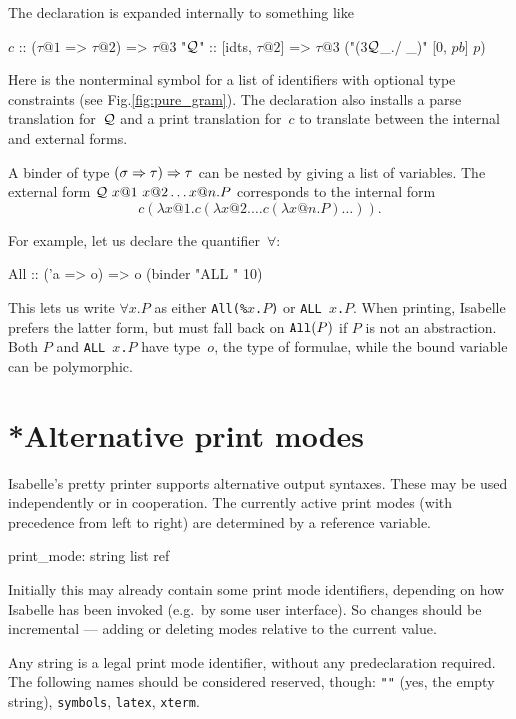 The declaration is expanded internally to something like
\begin{ttbox}
\(c\)\hskip3pt    :: (\(\tau@1\) => \(\tau@2\)) => \(\tau@3\)
"\({\cal Q}\)"  :: [idts, \(\tau@2\)] => \(\tau@3\)   ("(3\({\cal Q}\)_./ _)" [0, \(pb\)] \(p\))
\end{ttbox}
Here  is the nonterminal symbol for a list of identifiers with
optional type constraints (see Fig.\ts\ref{fig:pure_gram}).  The
declaration also installs a parse translation
for~${\cal Q}$ and a print translation for~$c$ to
translate between the internal and external forms.

A binder of type $(\sigma \Rightarrow \tau) \Rightarrow \tau$ can be nested by giving a
list of variables.  The external form ${\cal Q}~x@1~x@2 \ldots x@n. P$
corresponds to the internal form
\[ c(\lambda x@1. c(\lambda x@2. \ldots c(\lambda x@n. P) \ldots)). \]

\medskip
For example, let us declare the quantifier~$\forall$:
\begin{ttbox}
All :: ('a => o) => o   (binder "ALL " 10)
\end{ttbox}
This lets us write $\forall x.P$ as either {\tt All(\%$x$.$P$)} or {\tt ALL
  $x$.$P$}.  When printing, Isabelle prefers the latter form, but must fall
back on ${\tt All}(P)$ if $P$ is not an abstraction.  Both $P$ and {\tt ALL
  $x$.$P$} have type~$o$, the type of formulae, while the bound variable
can be polymorphic.
\endgroup



\section{*Alternative print modes} \label{sec:prmodes}
%
Isabelle's pretty printer supports alternative output syntaxes. These
may be used independently or in cooperation. The currently active
print modes (with precedence from left to right) are determined by a
reference variable.
\begin{ttbox}
print_mode: string list ref
\end{ttbox}
Initially this may already contain some print mode identifiers,
depending on how Isabelle has been invoked (e.g.\ by some user
interface). So changes should be incremental --- adding or deleting
modes relative to the current value.

Any \ML{} string is a legal print mode identifier, without any
predeclaration required.  The following names should be considered
reserved, though: \texttt{""} (yes, the empty string),
\texttt{symbols}, \texttt{latex}, \texttt{xterm}.

